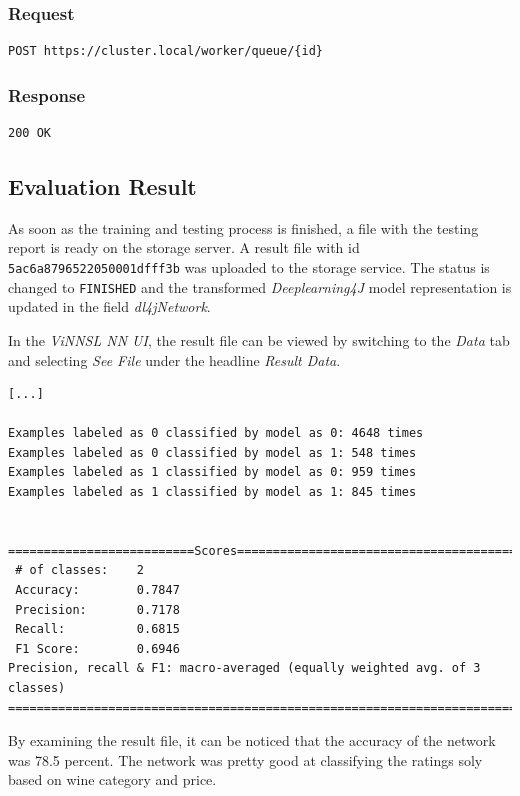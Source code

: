 \subsubsection{Request}\label{request-5}

\begin{verbatim}
POST https://cluster.local/worker/queue/{id}
\end{verbatim}

\subsubsection{Response}\label{response-5}

\begin{verbatim}
200 OK
\end{verbatim}

\subsection{Evaluation Result}\label{evaluation-result-1}

As soon as the training and testing process is finished, a file with the
testing report is ready on the storage server. A result file with id
\texttt{5ac6a8796522050001dfff3b} was uploaded to the storage service.
The status is changed to \texttt{FINISHED} and the transformed
\emph{Deeplearning4J} model representation is updated in the field
\emph{dl4jNetwork}.

In the \emph{ViNNSL NN UI}, the result file can be viewed by switching
to the \emph{Data} tab and selecting \emph{See File} under the headline
\emph{Result Data}.

\begin{verbatim}
[...]

Examples labeled as 0 classified by model as 0: 4648 times
Examples labeled as 0 classified by model as 1: 548 times
Examples labeled as 1 classified by model as 0: 959 times
Examples labeled as 1 classified by model as 1: 845 times


==========================Scores===========================================
 # of classes:    2
 Accuracy:        0.7847
 Precision:       0.7178    
 Recall:          0.6815    
 F1 Score:        0.6946    
Precision, recall & F1: macro-averaged (equally weighted avg. of 3 classes)
===========================================================================
\end{verbatim}

By examining the result file, it can be noticed that the accuracy of the
network was 78.5 percent. The network was pretty good at classifying the
ratings soly based on wine category and price.


